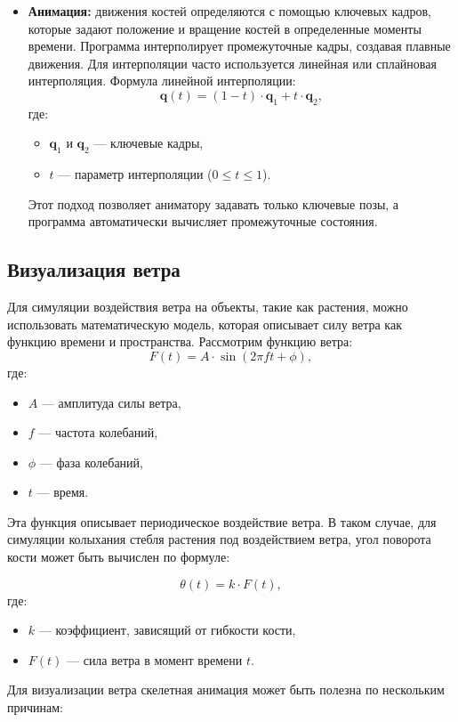 \begin{itemize}
    
    \item \textbf{Анимация:} движения костей определяются с помощью ключевых кадров, которые задают положение и вращение костей в определенные моменты времени. Программа интерполирует промежуточные кадры, создавая плавные движения. Для интерполяции часто используется линейная или сплайновая интерполяция. 
    Формула линейной интерполяции:
    \[
\mathbf{q}(t) = (1 - t) \cdot \mathbf{q}_1 + t \cdot \mathbf{q}_2,
\]
где:
\begin{itemize}
    \item \(\mathbf{q}_1\) и \(\mathbf{q}_2\) — ключевые кадры,
    \item \(t\) — параметр интерполяции (\(0 \leq t \leq 1\)).
\end{itemize}
Этот подход позволяет аниматору задавать только ключевые позы, а программа автоматически вычисляет промежуточные состояния.
\end{itemize}



\subsection{Визуализация ветра}

Для симуляции воздействия ветра на объекты, такие как растения, можно использовать математическую модель, которая описывает силу ветра как функцию времени и пространства.
Рассмотрим функцию ветра:
\[
F(t) = A \cdot \sin(2\pi f t + \phi),
\]
где:
\begin{itemize}
    \item \(A\) — амплитуда силы ветра,
    \item \(f\) — частота колебаний,
    \item \(\phi\) — фаза колебаний,
    \item \(t\) — время.
\end{itemize}

Эта функция описывает периодическое воздействие ветра. В таком случае, для симуляции колыхания стебля растения под воздействием ветра, угол поворота кости может быть вычислен по формуле:

\[
\theta(t) = k \cdot F(t),
\]
где:
\begin{itemize}
    \item \(k\) — коэффициент, зависящий от гибкости кости,
    \item \(F(t)\) — сила ветра в момент времени \(t\).
\end{itemize}

Для визуализации ветра скелетная анимация может быть полезна по нескольким причинам:

